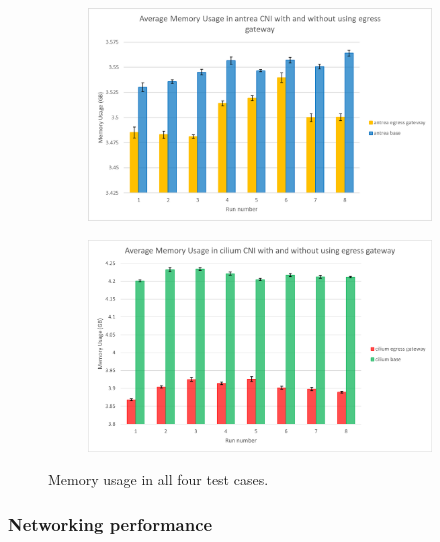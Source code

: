 \begin{figure}[H]
    \begin{subfigure}[b]{0.35\textwidth}
        \includegraphics[width=\textwidth]{plots/small/memory_antrea.png}
        \caption{}
        \label{fig:memory_c}
    \end{subfigure}
    \hfill
    \begin{subfigure}[b]{0.35\textwidth}
        \includegraphics[width=\textwidth]{plots/small/memory_cilium.png}
        \caption{}
        \label{fig:memory_d}
    \end{subfigure}
    
    \caption{Memory usage in all four test cases.}
    \label{fig:memoryFour}
\end{figure}



\subsubsection{Networking performance}
\label{sec:egressNetworkingPerformance}

